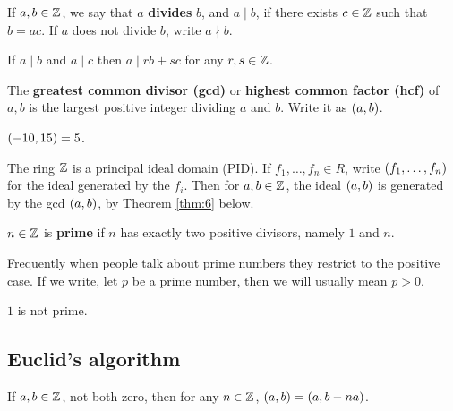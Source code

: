 \begin{definition}
If $ a, b \in \mathbb{Z} $, we say that $ a $ \textbf{divides} $ b $, and $ a \mid b $, if there exists $ c \in \mathbb{Z} $ such that $ b = ac $. If $ a $ does not divide $ b $, write $ a \nmid b $.
\end{definition}

If $ a \mid b $ and $ a \mid c $ then $ a \mid rb + sc $ for any $ r, s \in \mathbb{Z} $.

\begin{definition}
The \textbf{greatest common divisor (gcd)} or \textbf{highest common factor (hcf)} of $ a, b $ is the largest positive integer dividing $ a $ and $ b $. Write it as $ \br{a, b} $.
\end{definition}

\begin{example*}
$ \br{-10, 15} = 5 $.
\end{example*}

\begin{note*}
The ring $ \mathbb{Z} $ is a principal ideal domain (PID). If $ f_1, \dots, f_n \in R $, write $ \br{f_1, \dots, f_n} $ for the ideal generated by the $ f_i $. Then for $ a, b \in \mathbb{Z} $, the ideal $ \br{a, b} $ is generated by the gcd $ \br{a, b} $, by Theorem \ref{thm:6} below.
\end{note*}

\begin{definition}
$ n \in \mathbb{Z} $ is \textbf{prime} if $ n $ has exactly two positive divisors, namely $ 1 $ and $ n $.
\end{definition}

\begin{note*}
Frequently when people talk about prime numbers they restrict to the positive case. If we write, let $ p $ be a prime number, then we will usually mean $ p > 0 $.
\end{note*}

\begin{note*}
$ 1 $ is not prime.
\end{note*}

\subsection{Euclid's algorithm}

\begin{proposition}
If $ a, b \in \mathbb{Z} $, not both zero, then for any $ n \in \mathbb{Z} $, $ \br{a, b} = \br{a, b - na} $.
\end{proposition}

